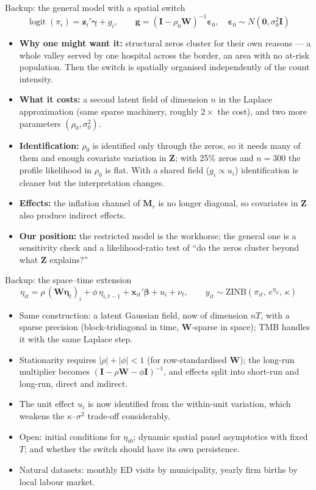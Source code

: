 \documentclass[10pt,aspectratio=169]{beamer}
\newcommand{\bW}{\mathbf{W}}
\newcommand{\bZ}{\mathbf{Z}}
\newcommand{\bI}{\mathbf{I}}
\newcommand{\bbeta}{\boldsymbol{\beta}}
\newcommand{\bgamma}{\boldsymbol{\gamma}}
\DeclareMathOperator{\logit}{logit}
\begin{document}
\begin{frame}{Backup: the general model with a spatial switch}
  \small
  \[
    \logit(\pi_i) = \mathbf z_i'\bgamma + g_i, \qquad \mathbf g = (\bI-\rho_0\bW)^{-1}\boldsymbol\varepsilon_0, \quad \boldsymbol\varepsilon_0\sim N(\mathbf 0,\sigma_0^2\bI)
  \]
  \begin{itemize}\setlength{\itemsep}{0.45em}
    \item \textbf{Why one might want it:} structural zeros cluster for their own reasons --- a whole valley served by one hospital across the border, an area with no at-risk population. Then the switch is spatially organised independently of the count intensity.
    \item \textbf{What it costs:} a second latent field of dimension $n$ in the Laplace approximation (same sparse machinery, roughly $2\times$ the cost), and two more parameters $(\rho_0,\sigma_0^2)$.
    \item \textbf{Identification:} $\rho_0$ is identified only through the zeros, so it needs many of them and enough covariate variation in $\bZ$; with 25\% zeros and $n=300$ the profile likelihood in $\rho_0$ is flat. With a shared field ($g_i\propto u_i$) identification is cleaner but the interpretation changes.
    \item \textbf{Effects:} the inflation channel of $\mathbf M_r$ is no longer diagonal, so covariates in $\bZ$ also produce indirect effects.
    \item \textbf{Our position:} the restricted model is the workhorse; the general one is a sensitivity check and a likelihood-ratio test of ``do the zeros cluster beyond what $\bZ$ explains?''
  \end{itemize}
\end{frame}

\begin{frame}{Backup: the space--time extension}
  \[
    \eta_{it} = \rho\,(\bW\boldsymbol\eta_t)_i + \phi\,\eta_{i,t-1} + \mathbf x_{it}'\bbeta + u_i + \nu_t, \qquad y_{it}\sim \text{ZINB}(\pi_{it},\,e^{\eta_{it}},\,\kappa)
  \]
  \begin{itemize}\setlength{\itemsep}{0.45em}
    \item Same construction: a latent Gaussian field, now of dimension $nT$, with a sparse precision (block-tridiagonal in time, $\bW$-sparse in space); TMB handles it with the same Laplace step.
    \item Stationarity requires $|\rho|+|\phi|<1$ (for row-standardised $\bW$); the long-run multiplier becomes $(\bI-\rho\bW-\phi\bI)^{-1}$, and effects split into short-run and long-run, direct and indirect.
    \item The unit effect $u_i$ is now identified from the within-unit variation, which weakens the $\kappa$--$\sigma^2$ trade-off considerably.
    \item Open: initial conditions for $\eta_{i0}$; dynamic spatial panel asymptotics with fixed $T$; and whether the switch should have its own persistence.
    \item Natural datasets: monthly ED visits by municipality, yearly firm births by local labour market.
  \end{itemize}
\end{frame}
\end{document}
